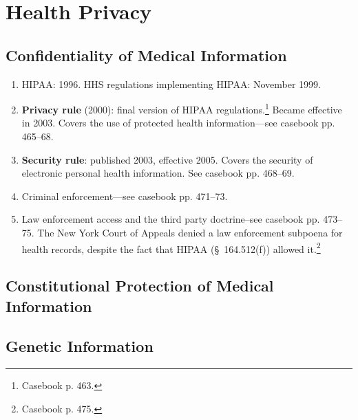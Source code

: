 \section{Health Privacy}

\subsection{Confidentiality of Medical Information}

\begin{enumerate}
    \item HIPAA: 1996. HHS regulations implementing HIPAA: November 1999.
    \item \textbf{Privacy rule} (2000): final version of HIPAA 
    regulations.\footnote{Casebook p. 463.} Became effective in 2003. Covers the 
    use of protected health information---see casebook pp. 465--68.
    \item \textbf{Security rule}: published 2003, effective 2005. Covers the 
    security of electronic personal health information. See casebook pp. 
    468--69.
    \item Criminal enforcement---see casebook pp. 471--73.
    \item Law enforcement access and the third party doctrine--see casebook pp. 
    473--75. The New York Court of Appeals denied a law enforcement subpoena for 
    health records, despite the fact that HIPAA (\S\ 164.512(f)) allowed 
    it.\footnote{Casebook p. 475.}
\end{enumerate}

\subsection{Constitutional Protection of Medical Information}


\subsection{Genetic Information}



